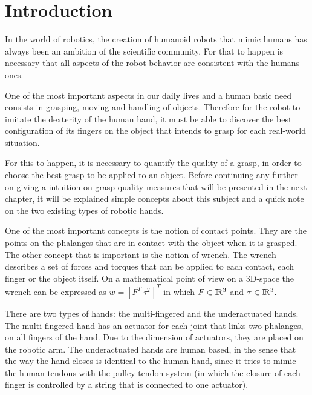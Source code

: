 
\chapter{Introduction}
\label{chapter:introduction}




In the world of robotics, the creation of humanoid robots that mimic humans has always been an ambition of the scientific community. For that to happen is necessary that all aspects of the robot behavior are consistent with the humans ones.
\par
One of the most important aspects in our daily lives and a human basic need consists in grasping, moving and handling of objects. Therefore  for the robot to imitate the dexterity of the human hand, it must be able to discover the best configuration of its fingers on the object that intends to grasp for each real-world situation.
\par
For this to happen, it is necessary to quantify the quality of a grasp, in order to choose the best grasp to be applied to an object. Before continuing any further on giving a intuition on grasp quality measures that will be presented in the next chapter, it will be explained simple concepts about this subject and a quick note on the two existing types of robotic hands.
\par
One of the most important concepts is the notion of contact points. They are the points on the phalanges that are in contact with the object when it is grasped. The other concept that is important is the notion of wrench. The wrench describes a set of forces and torques that can be applied to each contact, each finger or the object itself. On a mathematical point of view on a 3D-space the wrench can be expressed as $w = [F^T\ \tau^T]^T$ in which $F\in \rm I\!R^{3}$ and $\tau \in \rm I\!R^{3}$.
\par
There are two types of hands: the multi-fingered and the underactuated hands. The multi-fingered hand has an actuator for each joint that links two phalanges, on all fingers of the hand. Due to the dimension of actuators, they are placed on the robotic arm. The underactuated hands are human based, in the sense that the way the hand closes is identical to the human hand, since it tries to mimic the human tendons with the pulley-tendon system (in which the closure of each finger is controlled by a string that is connected to one actuator).
